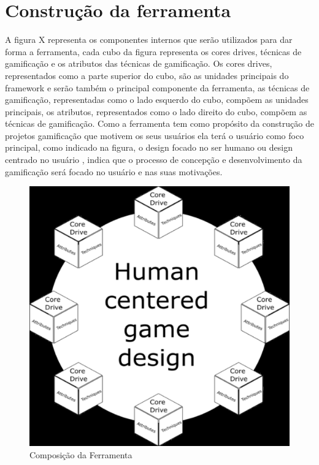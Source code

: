 \newpage

\section{Construção da ferramenta}

A figura X representa os componentes internos que serão utilizados para dar forma a ferramenta, cada cubo da figura representa os cores drives, técnicas de gamificação e os atributos das técnicas de gamificação. Os cores drives, representados como a parte superior do cubo, são as unidades principais do framework e serão também o principal componente da ferramenta, as técnicas de gamificação, representadas como o lado esquerdo do cubo, compõem as unidades principais, os atributos, representados como o lado direito do cubo, compõem as técnicas de gamificação. Como a ferramenta tem como propósito da construção de projetos gamificação que motivem os seus usuários ela terá o usuário como foco principal, como indicado na figura, o design focado no ser humano \cite{chou2015actionable} ou design centrado no usuário \cite{JanakiMythilyKumar and Mario Herger}, indica que o processo de concepção e desenvolvimento da gamificação será focado no usuário e nas suas motivações. 

\begin{figure}[h]
	\centering
	\label{fig01}
		\includegraphics[keepaspectratio=true,scale=0.5]{figuras/hcgd.eps}
	\caption{Composição da Ferramenta}
\end{figure}


